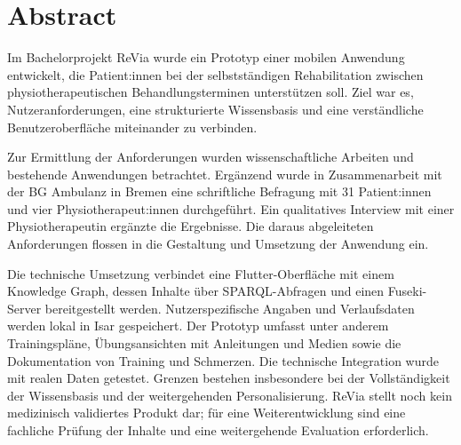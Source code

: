 \documentclass[11pt,a4paper]{article}
\begin{document}
\hypersetup{pageanchor=false}

\clearpage
\hypersetup{pageanchor=true}

\section*{Abstract}
Im Bachelorprojekt ReVia wurde ein Prototyp einer mobilen Anwendung entwickelt, die Patient:innen bei der selbstständigen Rehabilitation zwischen physiotherapeutischen Behandlungsterminen unterstützen soll. Ziel war es, Nutzeranforderungen, eine strukturierte Wissensbasis und eine verständliche Benutzeroberfläche miteinander zu verbinden.

Zur Ermittlung der Anforderungen wurden wissenschaftliche Arbeiten und bestehende Anwendungen betrachtet. Ergänzend wurde in Zusammenarbeit mit der BG Ambulanz in Bremen eine schriftliche Befragung mit 31 Patient:innen und vier Physiotherapeut:innen durchgeführt. Ein qualitatives Interview mit einer Physiotherapeutin ergänzte die Ergebnisse. Die daraus abgeleiteten Anforderungen flossen in die Gestaltung und Umsetzung der Anwendung ein.

Die technische Umsetzung verbindet eine Flutter-Oberfläche mit einem Knowledge Graph, dessen Inhalte über SPARQL-Abfragen und einen Fuseki-Server bereitgestellt werden. Nutzerspezifische Angaben und Verlaufsdaten werden lokal in Isar gespeichert. Der Prototyp umfasst unter anderem Trainingspläne, Übungsansichten mit Anleitungen und Medien sowie die Dokumentation von Training und Schmerzen. Die technische Integration wurde mit realen Daten getestet. Grenzen bestehen insbesondere bei der Vollständigkeit der Wissensbasis und der weitergehenden Personalisierung. ReVia stellt noch kein medizinisch validiertes Produkt dar; für eine Weiterentwicklung sind eine fachliche Prüfung der Inhalte und eine weitergehende Evaluation erforderlich.
\clearpage

\tableofcontents
\clearpage

{}
\listoffigures
\vspace{1.5em}                    %
{}
\listoftables
\clearpage











\newpage
\nocite{*}
\printbibliography[heading=bibintoc]

\clearpage

\end{document}
